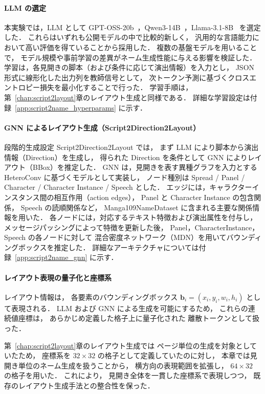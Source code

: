 \documentclass[a4j,12pt,dvipdfmx]{jsreport}
\begin{document}
\paragraph{LLM の選定}
本実験では，LLM として GPT-OSS-20b~\cite{openai2024gptoss}，Qwen3-14B~\cite{qwen3_tech_2025}，Llama-3.1-8B~\cite{touvron2024llama31} を選定した．
これらはいずれも公開モデルの中で比較的新しく，
汎用的な言語能力において高い評価を得ていることから採用した．
複数の基盤モデルを用いることで，
モデル規模や事前学習の差異がネーム生成性能に与える影響を検証した．
学習は，各見開きの脚本（および条件に応じて演出情報）を入力とし，
JSON 形式に線形化した出力列を教師信号として，
次トークン予測に基づくクロスエントロピー損失を最小化することで行った．
学習手順は，第~\ref{chap:script2layout}章のレイアウト生成と同様である．
詳細な学習設定は付録~\ref{app:script2name_hyperparams} に示す．

\paragraph{GNN によるレイアウト生成（Script2Direction2Layout）}
段階的生成設定 Script2Direction2Layout では，
まず LLM により脚本から演出情報（Direction）を生成し，
得られた Direction を条件として
GNN によりレイアウト（BBox）を推定した．
GNN は，見開きを表す異種グラフを入力とする HeteroConv に基づくモデルとして実装し，
ノード種別は Spread / Panel / Character / Character Instance / Speech とした．
エッジには，キャラクターインスタンス間の相互作用（action edges），
Panel と Character Instance の包含関係，
Speech の読順関係など，
Manga109NameDataset に含まれる主要な関係情報を用いた．
各ノードには，対応するテキスト特徴および演出属性を付与し，
メッセージパッシングによって特徴を更新した後，
Panel，CharacterInstance，Speech の各ノードに対して
混合密度ネットワーク（MDN）を用いてバウンディングボックスを推定した．
詳細なアーキテクチャについては付録~\ref{app:script2name_gnn} に示す．

\paragraph{レイアウト表現の量子化と座標系}
レイアウト情報は，
各要素のバウンディングボックス
$\mathbf{b}_i = (x_i, y_i, w_i, h_i)$
として表現される．
LLM および GNN による生成を可能にするため，
これらの連続値座標は，
あらかじめ定義した格子上に量子化された
離散トークンとして扱った．

第~\ref{chap:script2layout}章のレイアウト生成では
ページ単位の生成を対象としていたため，
座標系を $32 \times 32$ の格子として定義していたのに対し，
本章では見開き単位のネーム生成を扱うことから，
横方向の表現範囲を拡張し，
$64 \times 32$ の格子を用いた．
これにより，
見開き全体を一貫した座標系で表現しつつ，
既存のレイアウト生成手法との整合性を保った．
\end{document}
